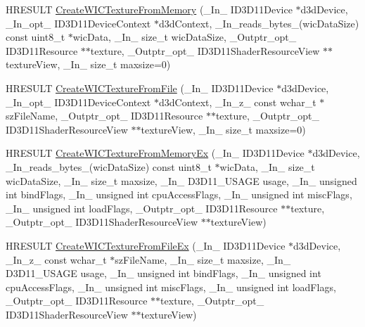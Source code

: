 \begin{DoxyCompactItemize}
\item 
H\+R\+E\+S\+U\+LT \mbox{\hyperlink{namespace_direct_x_afe67970a867e51ea4f153cf50cd68f86}{Create\+W\+I\+C\+Texture\+From\+Memory}} (\+\_\+\+In\+\_\+ I\+D3\+D11\+Device $\ast$d3d\+Device, \+\_\+\+In\+\_\+opt\+\_\+ I\+D3\+D11\+Device\+Context $\ast$d3d\+Context, \+\_\+\+In\+\_\+reads\+\_\+bytes\+\_\+(wic\+Data\+Size) const uint8\+\_\+t $\ast$wic\+Data, \+\_\+\+In\+\_\+ size\+\_\+t wic\+Data\+Size, \+\_\+\+Outptr\+\_\+opt\+\_\+ I\+D3\+D11\+Resource $\ast$$\ast$texture, \+\_\+\+Outptr\+\_\+opt\+\_\+ I\+D3\+D11\+Shader\+Resource\+View $\ast$$\ast$texture\+View, \+\_\+\+In\+\_\+ size\+\_\+t maxsize=0)
\item 
H\+R\+E\+S\+U\+LT \mbox{\hyperlink{namespace_direct_x_a8907d700dcbb64e9a172ac986ade4877}{Create\+W\+I\+C\+Texture\+From\+File}} (\+\_\+\+In\+\_\+ I\+D3\+D11\+Device $\ast$d3d\+Device, \+\_\+\+In\+\_\+opt\+\_\+ I\+D3\+D11\+Device\+Context $\ast$d3d\+Context, \+\_\+\+In\+\_\+z\+\_\+ const wchar\+\_\+t $\ast$sz\+File\+Name, \+\_\+\+Outptr\+\_\+opt\+\_\+ I\+D3\+D11\+Resource $\ast$$\ast$texture, \+\_\+\+Outptr\+\_\+opt\+\_\+ I\+D3\+D11\+Shader\+Resource\+View $\ast$$\ast$texture\+View, \+\_\+\+In\+\_\+ size\+\_\+t maxsize=0)
\item 
H\+R\+E\+S\+U\+LT \mbox{\hyperlink{namespace_direct_x_a6f07a913b5f44a124de427d73afea1a4}{Create\+W\+I\+C\+Texture\+From\+Memory\+Ex}} (\+\_\+\+In\+\_\+ I\+D3\+D11\+Device $\ast$d3d\+Device, \+\_\+\+In\+\_\+reads\+\_\+bytes\+\_\+(wic\+Data\+Size) const uint8\+\_\+t $\ast$wic\+Data, \+\_\+\+In\+\_\+ size\+\_\+t wic\+Data\+Size, \+\_\+\+In\+\_\+ size\+\_\+t maxsize, \+\_\+\+In\+\_\+ D3\+D11\+\_\+\+U\+S\+A\+GE usage, \+\_\+\+In\+\_\+ unsigned int bind\+Flags, \+\_\+\+In\+\_\+ unsigned int cpu\+Access\+Flags, \+\_\+\+In\+\_\+ unsigned int misc\+Flags, \+\_\+\+In\+\_\+ unsigned int load\+Flags, \+\_\+\+Outptr\+\_\+opt\+\_\+ I\+D3\+D11\+Resource $\ast$$\ast$texture, \+\_\+\+Outptr\+\_\+opt\+\_\+ I\+D3\+D11\+Shader\+Resource\+View $\ast$$\ast$texture\+View)
\item 
H\+R\+E\+S\+U\+LT \mbox{\hyperlink{namespace_direct_x_af2065bbcfa2e7f066de9583dc7c3c61d}{Create\+W\+I\+C\+Texture\+From\+File\+Ex}} (\+\_\+\+In\+\_\+ I\+D3\+D11\+Device $\ast$d3d\+Device, \+\_\+\+In\+\_\+z\+\_\+ const wchar\+\_\+t $\ast$sz\+File\+Name, \+\_\+\+In\+\_\+ size\+\_\+t maxsize, \+\_\+\+In\+\_\+ D3\+D11\+\_\+\+U\+S\+A\+GE usage, \+\_\+\+In\+\_\+ unsigned int bind\+Flags, \+\_\+\+In\+\_\+ unsigned int cpu\+Access\+Flags, \+\_\+\+In\+\_\+ unsigned int misc\+Flags, \+\_\+\+In\+\_\+ unsigned int load\+Flags, \+\_\+\+Outptr\+\_\+opt\+\_\+ I\+D3\+D11\+Resource $\ast$$\ast$texture, \+\_\+\+Outptr\+\_\+opt\+\_\+ I\+D3\+D11\+Shader\+Resource\+View $\ast$$\ast$texture\+View)

\end{DoxyCompactItemize}
